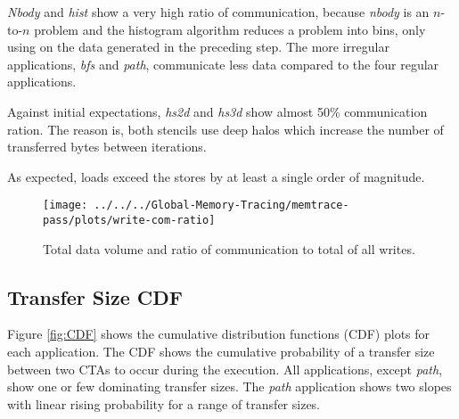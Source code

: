 \textit{Nbody} and \textit{hist} show a very high ratio of communication, because \textit{nbody} is an $n$-to-$n$ problem and the histogram algorithm reduces a problem into bins, only using on the data generated in the preceding step. The more irregular applications, \textit{bfs} and \textit{path}, communicate less data compared to the four regular applications.

Against initial expectations,  \textit{hs2d} and \textit{hs3d} show almost 50\% communication ration. The reason is, both stencils use deep halos which increase the number of transferred bytes between iterations. 

As expected, loads exceed the stores by at least a single order of magnitude.
\begin{figure}[t]
	\centering
	\texttt{[image: ../../../Global-Memory-Tracing/memtrace-pass/plots/write-com-ratio]}
	\caption{Total data volume and ratio of communication to total of all writes.}
	\label{com-ratio}
\end{figure}
\subsection{Transfer Size CDF}
Figure \ref{fig:CDF} shows the cumulative distribution functions (CDF) plots for each application. The CDF shows the cumulative probability of a transfer size between two CTAs to occur during the execution. All applications, except \textit{path}, show one or few dominating transfer sizes. The \textit{path} application shows two slopes with linear rising probability for a range of transfer sizes.

